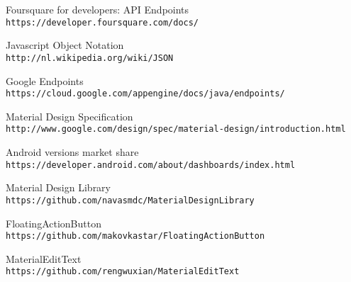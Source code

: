 \begin{thebibliography}{9}


Foursquare for developers: API Endpoints
\\\texttt{https://developer.foursquare.com/docs/}

Javascript Object Notation
\\\texttt{http://nl.wikipedia.org/wiki/JSON}

Google Endpoints
\\\texttt{https://cloud.google.com/appengine/docs/java/endpoints/}

Material Design Specification
\\\texttt{http://www.google.com/design/spec/material-design/introduction.html}

Android versions market share
\\\texttt{https://developer.android.com/about/dashboards/index.html}

Material Design Library
\\\texttt{https://github.com/navasmdc/MaterialDesignLibrary}

FloatingActionButton
\\\texttt{https://github.com/makovkastar/FloatingActionButton}

MaterialEditText
\\\texttt{https://github.com/rengwuxian/MaterialEditText}


\end{thebibliography}





